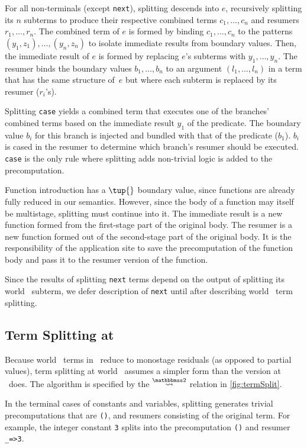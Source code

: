 \begin{abstrsyn}
For all non-terminals (except \texttt{next}),
splitting descends into $e$, recursively splitting its $n$ subterms
to produce their respective combined terms $c_1,\ldots,c_n$ and resumers $r_1, \ldots, r_n$.
The combined term of $e$ is formed by binding $c_1,\ldots,c_n$
to the patterns $(y_1,z_1),\ldots,(y_n,z_n)$
to isolate immediate results from boundary values. Then,
the immediate result of $e$ is formed by replacing $e$'s subterms with $y_1,\ldots,y_n$.
The resumer binds the boundary values $b_1,\ldots,b_n$ to an
argument $(l_1,\ldots,l_n)$ in a term that has the same structure
of~$e$ but where each subterm is replaced by its resumer ($r_i$'s).

Splitting {\tt case} yields a combined term that executes one of the branches' combined terms based on the immediate result $y_1$ of the predicate.
The boundary value $b_i$ for this branch is injected and bundled with that of the predicate ($b_1$).   
$b_i$ is cased in the resumer to determine which branch's resumer should be executed.
{\tt case} is the only rule where splitting adds non-trivial logic is added to the precomputation.

Function introduction has a $\tup{}$ boundary value,
since functions are already fully reduced in our semantics.
However, since the body of a function may itself be multistage, splitting must continue into it.
The immediate result is a new function formed from the first-stage part of the original body.
The resumer is a new function formed out of the second-stage part of the original body.
It is the responsibility of the application site to save the precomputation of the function body
and pass it to the resumer version of the function.

Since the results of splitting \texttt{next} terms depend on the output of
splitting its world \bbtwo\ subterm,
we defer description of \texttt{next} until after describing world \bbtwo\ term splitting.

\subsection{Term Splitting at \bbtwo}

Because world \bbtwo\ terms in \lang\ reduce to monostage residuals (as opposed to partial values),
term splitting at world \bbtwo\ assumes a simpler form than the version at \bbonem\ does. 
The algorithm is specified by the $\splittwosym$ relation in \cref{fig:termSplit}.

In the terminal cases of
constants and variables, splitting generates trivial precomputations that are \texttt{()}, and resumers consisting of the original term.
For example, the integer constant \texttt{3} splits into the
precomputation \texttt{()} and resumer \texttt{\_=>3}.


\end{abstrsyn}
